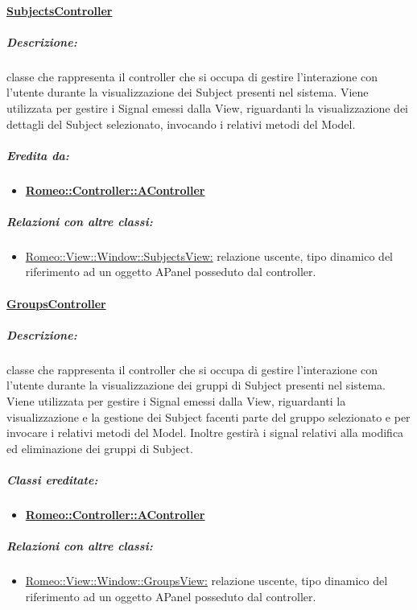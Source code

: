 	\paragraph{\underline{SubjectsController}}
	\label{controller_ss} 
		\subparagraph{Descrizione:} classe che rappresenta il controller che si occupa di gestire l'interazione con l'utente durante la visualizzazione dei Subject\glossario{} presenti nel sistema. Viene utilizzata per gestire i Signal\g{} emessi dalla View, riguardanti la visualizzazione dei dettagli del Subject\glossario{} selezionato, invocando i relativi metodi del Model. 
		\subparagraph{Eredita da:} 
			\begin{itemize}
				\item \textbf{\hyperref[controller_a]{Romeo::Controller::AController}}
			\end{itemize}
			\subparagraph{Relazioni con altre classi:}
				\begin{itemize}
					\item \hyperref[vsv]{Romeo::View::Window::SubjectsView:} relazione uscente, tipo dinamico del riferimento ad un oggetto APanel posseduto dal controller.
				\end{itemize}
		
		
	\paragraph{\underline{GroupsController}}
	\label{controller_sg}
		\subparagraph{Descrizione:} classe che rappresenta il controller che si occupa di gestire l'interazione con l'utente durante la visualizzazione dei gruppi di Subject\glossario{} presenti nel sistema. Viene utilizzata per gestire i Signal\g{} emessi dalla View, riguardanti la visualizzazione e la gestione dei Subject\glossario{} facenti parte del gruppo selezionato e per invocare i relativi metodi del Model. Inoltre gestirà i signal\g{} relativi alla modifica ed eliminazione dei gruppi di Subject\glossario{}.
		\subparagraph{Classi ereditate:} 
			\begin{itemize}
				\item \textbf{\hyperref[controller_a]{Romeo::Controller::AController}}
			\end{itemize}
		\subparagraph{Relazioni con altre classi:}
			\begin{itemize}
				\item \hyperref[vgv]{Romeo::View::Window::GroupsView:} relazione uscente, tipo dinamico del riferimento ad un oggetto APanel posseduto dal controller.
			\end{itemize}
		
